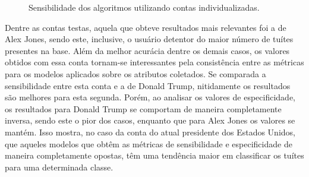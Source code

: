\documentclass[oneside,openright,12pt]{ufsm_2015} %
\begin{document}
    \begin{figure}[!ht]
    \caption{Sensibilidade dos algoritmos utilizando contas individualizadas.}
    \centering
    \label{tik:sensibilidade-individual}
    \end{figure}
    
    \par Dentre as contas testas, aquela que obteve resultados mais relevantes foi a de Alex Jones, sendo este, inclusive, o usuário detentor do maior número de tuítes presentes na base. Além da melhor acurácia dentre os demais casos, os valores obtidos com essa conta tornam-se interessantes pela consistência entre as métricas para os modelos aplicados sobre os atributos coletados. Se comparada a sensibilidade entre esta conta e a de Donald Trump, nitidamente os resultados são melhores para esta segunda. Porém, ao analisar os valores de especificidade, os resultados para Donald Trump se comportam de maneira completamente inversa, sendo este o pior dos casos, enquanto que para Alex Jones os valores se mantém. Isso mostra, no caso da conta do atual presidente dos Estados Unidos, que aqueles modelos que obtêm as métricas de sensibilidade e especificidade de maneira completamente opostas, têm uma tendência maior em classificar os tuítes para uma determinada classe.
    
\end{document}
